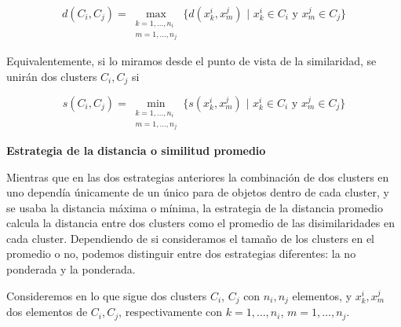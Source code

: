 \[
d(C_{i},C_{j}) = \max_{\substack{k=1,\dots,n_{i} \\ m=1,\dots,n_{j}}}\{d(x^{i}_{k},x^{j}_{m}) \text{ | } x^{i}_{k} \in C_{i} \text{ y } x^{j}_{m} \in C_{j}\}
\]

Equivalentemente, si lo miramos desde el punto de vista de la similaridad, se unirán dos clusters $C_{i}, C_{j}$ si

\[
s(C_{i},C_{j}) = \min_{\substack{k=1,\dots,n_{i} \\ m=1,\dots,n_{j}}}\{s(x^{i}_{k},x^{j}_{m}) \text{ | } x^{i}_{k} \in C_{i} \text{ y } x^{j}_{m} \in C_{j}\}
\]

\textbf{Estrategia de la distancia o similitud promedio}

Mientras que en las dos estrategias anteriores la combinación de dos clusters en uno dependía únicamente de un único para de objetos dentro de cada cluster, 
y se usaba la distancia máxima o mínima, la estrategia de la distancia promedio calcula la distancia entre dos clusters como el promedio de las disimilaridades 
en cada cluster. Dependiendo de si consideramos el tamaño de los clusters en el promedio o no, podemos distinguir entre dos estrategias diferentes: la no ponderada
y la ponderada. \newline

Consideremos en lo que sigue dos clusters $C_{i}$, $C_{j}$ con $n_{i},n_{j}$ elementos, y $x^{i}_{k},x^{j}_{m}$ dos elementos de $C_{i},C_{j}$, respectivamente con $k=1,\dots,n_{i}$, $m=1,\dots,n_{j}$.

